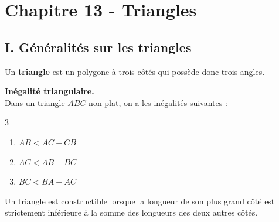 \section*{Chapitre 13 - Triangles}

\subsection*{I. Généralités sur les triangles}

  \vspace{0.3cm}
\begin{Définition}
Un \textbf{triangle} est un polygone à trois côtés qui possède donc trois angles.
\end{Définition}
   \vspace{0.3cm}
\begin{Propriété}[c]\textbf{Inégalité triangulaire.}\\
Dans un triangle $ABC$ non plat, on a les inégalités suivantes :
\vspace{-0.5cm}
\begin{multicols}{3}
\begin{enumerate}
\item $AB < AC + CB$
\item $AC < AB + BC$
\item $BC < BA + AC$
\end{enumerate}
\end{multicols}
\end{Propriété}
 
  \vspace{0.3cm}
\begin{Propriété}[c]
Un triangle est constructible lorsque la longueur de son plus grand côté est strictement inférieure à la somme des longueurs des deux autres côtés.
\end{Propriété}
  \vspace{0.3cm}
 
